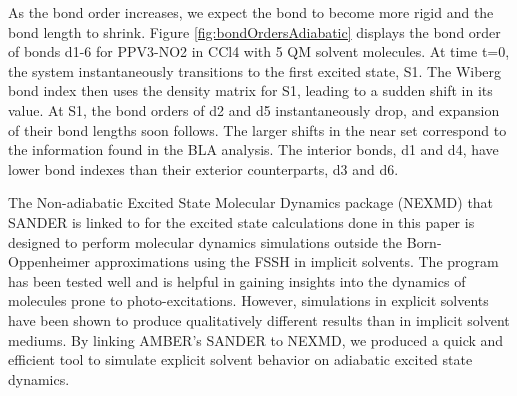     As the bond order increases, we expect the bond to become more rigid and the bond length to shrink.
    Figure \ref{fig:bondOrdersAdiabatic} displays the bond order of bonds d1-6 for PPV3-NO2 in CCl4 with 5 QM solvent molecules.
    At time t=0, the system instantaneously transitions to the first excited state, S1.
    The Wiberg bond index then uses the density matrix for S1, leading to a sudden shift in its value.
    At S1, the bond orders of d2 and d5 instantaneously drop, and expansion of their bond lengths soon follows.
    The larger shifts in the near set correspond to the information found in the BLA analysis.
    The interior bonds, d1 and d4, have lower bond indexes than their exterior counterparts, d3 and d6.

The Non-adiabatic Excited State Molecular Dynamics package (NEXMD) that SANDER is linked to for the excited state calculations done in this paper is designed to perform molecular dynamics simulations outside the Born-Oppenheimer approximations using the FSSH in implicit solvents.
The program has been tested well and is helpful in gaining insights into the dynamics of molecules prone to photo-excitations.
However, simulations in explicit solvents have been shown to produce qualitatively different results than in implicit solvent mediums.
By linking AMBER's SANDER to NEXMD, we produced a quick and efficient tool to simulate explicit solvent behavior on adiabatic excited state dynamics.
